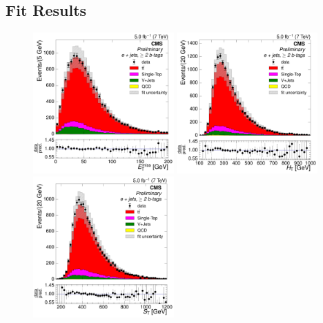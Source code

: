 \subsection{Fit Results}
\label{ss:fit_results}
\begin{figure}[hbtp]
    \centering
     \includegraphics[width=0.48\textwidth]{Chapters/04_Analysis/04b_XSections/images/control_plots/after_fit/7TeV/EPlusJets_patType1CorrectedPFMet_2orMoreBtags_with_ratio.pdf}\hfill
     \includegraphics[width=0.48\textwidth]{Chapters/04_Analysis/04b_XSections/images/control_plots/after_fit/7TeV/EPlusJets_HT_2orMoreBtags_with_ratio.pdf}\\
     \includegraphics[width=0.48\textwidth]{Chapters/04_Analysis/04b_XSections/images/control_plots/after_fit/7TeV/EPlusJets_patType1CorrectedPFMet_ST_2orMoreBtags_with_ratio.pdf}\hfill

\end{figure}
